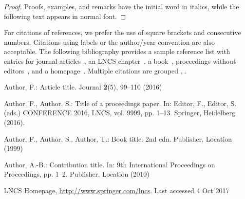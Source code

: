 \documentclass[runningheads]{llncs}
\begin{document}
%
%
\begin{proof}
Proofs, examples, and remarks have the initial word in italics,
while the following text appears in normal font.
\end{proof}
For citations of references, we prefer the use of square brackets
and consecutive numbers. Citations using labels or the author/year
convention are also acceptable. The following bibliography provides
a sample reference list with entries for journal
articles~\cite{ref_article1}, an LNCS chapter~\cite{ref_lncs1}, a
book~\cite{ref_book1}, proceedings without editors~\cite{ref_proc1},
and a homepage~\cite{ref_url1}. Multiple citations are grouped
\cite{ref_article1,ref_lncs1,ref_book1},
\cite{ref_article1,ref_book1,ref_proc1,ref_url1}.
%
%
%
% 
% 
%
\begin{thebibliography}{8}
Author, F.: Article title. Journal \textbf{2}(5), 99--110 (2016)

Author, F., Author, S.: Title of a proceedings paper. In: Editor,
F., Editor, S. (eds.) CONFERENCE 2016, LNCS, vol. 9999, pp. 1--13.
Springer, Heidelberg (2016). 

Author, F., Author, S., Author, T.: Book title. 2nd edn. Publisher,
Location (1999)

Author, A.-B.: Contribution title. In: 9th International Proceedings
on Proceedings, pp. 1--2. Publisher, Location (2010)

LNCS Homepage, \url{http://www.springer.com/lncs}. Last accessed 4
Oct 2017
\end{thebibliography}
\end{document}
